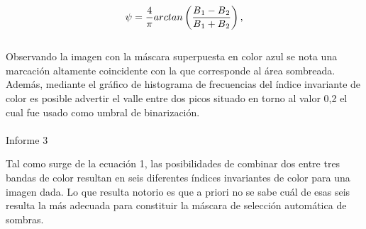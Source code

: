 \\
\begin{equation}
	\psi=\frac{4}{\pi} arctan\left(\frac{B\textsubscript{1}-B\textsubscript{2}}{B\textsubscript{1}+B\textsubscript{2}}\right),\label{invariante de color2}
\end{equation}
\\
Observando la imagen con la máscara superpuesta en color azul se nota una marcación altamente coincidente con la que corresponde al área sombreada. Además, mediante el gráfico de histograma de frecuencias del índice invariante de color es posible advertir el valle entre dos picos situado en torno al valor 0,2 el cual fue usado como umbral de binarización.
\\
\\
Informe 3

Tal como surge de la ecuación 1, las posibilidades de combinar dos entre tres bandas de color resultan en seis diferentes índices invariantes de color para una imagen dada. Lo que resulta notorio es que a priori no se sabe cuál de esas seis resulta la más adecuada para constituir la máscara de selección automática de sombras. 

